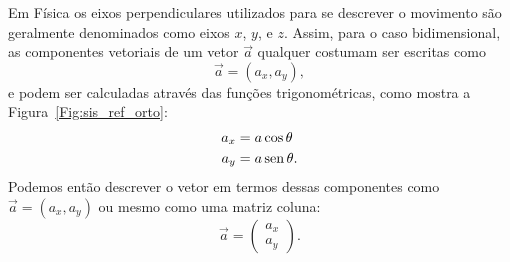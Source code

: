 Em Física os eixos perpendiculares utilizados para se descrever o movimento são geralmente denominados como eixos $x$, $y$, e $z$. Assim, para o caso bidimensional, as componentes vetoriais de um vetor $\vec{a}$ qualquer costumam ser escritas como
\begin{equation}
    \vec{a} = (a_x,a_y),
\end{equation}
%
e podem ser calculadas através das funções trigonométricas, como mostra a Figura~\ref{Fig:sis_ref_orto}:
%
\begin{align}
  a_x &= a \cos\theta \label{Eq:CompVetorEixoX}\\
  a_y &= a \operatorname{sen}\theta.\label{Eq:CompVetorEixoY}
\end{align}
%
Podemos então descrever o vetor em termos dessas componentes como $\vec{a} = (a_x, a_y)$ ou mesmo como uma matriz coluna:
\begin{equation}
  \vec{a} = \begin{pmatrix} a_x \\ a_y \end{pmatrix}.
\end{equation}

